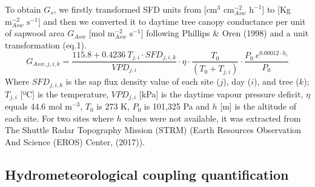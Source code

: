 \documentclass[11pt,twoside]{reedthesis}
\begin{document}
To obtain \(G_s\), we firstly transformed SFD units from
{[}\(\text{cm}^3\) \(\text{cm}^{-2}_{Asw}\) \(\text{h}^{-1}\){]} to
{[}Kg \(\text{m}^{-2}_{Asw}\) \(\text{s}^{-1}\){]} and then we converted
it to daytime tree canopy conductance per unit of sapwood area
\(G_{Asw}\) {[}mol \(\text{m}^{-2}_{Asw}\) \(\text{s}^{-1}\){]}
following Phillips \& Oren (1998) and a unit transformation (eq.1).
\begin{equation}
G_{Asw,j,i,k} = \frac{115.8 + 0.4236 \: T_{j , i} \cdot SFD_{j , i , k}}{VPD_{j,i}}\cdot \eta \cdot \frac{T_0}{(T_0 + T_{j,i})} \cdot \frac{P_0 \: e^{0.00012 \cdot h_i}}{P_0}
\end{equation}
Where \(SFD_{j,i,k}\) is the sap flux density value of each site
(\(j\)), day (\(i\)), and tree (\(k\)); \({T}_{j,i}\) {[}ºC{]} is the
temperature, \(VPD_{j,i}\) {[}kPa{]} is the daytime vapour pressure
deficit, \(\eta\) equals 44.6 mol \(\text{m}^{-3}\), \(T_0\) is 273 K,
\(P_0\) is 101,325 Pa and \(h\) {[}m{]} is the altitude of each site.
For two sites where \(h\) values were not available, it was extracted
from The Shuttle Radar Topography Mission (STRM) (Earth Resources
Observation And Science (EROS) Center, (2017)).\par

\subsection{Hydrometeorological coupling
quantification}\label{hydrometeorological-coupling-quantification}
\end{document}
